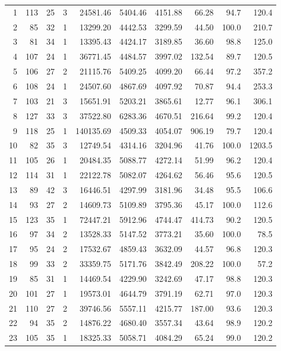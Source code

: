 \begin{longtable}{rrrrrrrrrr}
1 & 113 & 25 & 3 & 24581.46 & 5404.46 & 4151.88 & 66.28 & 94.7 & 120.4 \\
2 & 85 & 32 & 1 & 13299.20 & 4442.53 & 3299.59 & 44.50 & 100.0 & 210.7 \\
3 & 81 & 34 & 1 & 13395.43 & 4424.17 & 3189.85 & 36.60 & 98.8 & 125.0 \\
4 & 107 & 24 & 1 & 36771.45 & 4484.57 & 3997.02 & 132.54 & 89.7 & 120.5 \\
5 & 106 & 27 & 2 & 21115.76 & 5409.25 & 4099.20 & 66.44 & 97.2 & 357.2 \\
6 & 108 & 24 & 1 & 24507.60 & 4867.69 & 4097.92 & 70.87 & 94.4 & 253.3 \\
7 & 103 & 21 & 3 & 15651.91 & 5203.21 & 3865.61 & 12.77 & 96.1 & 306.1 \\
8 & 127 & 33 & 3 & 37522.80 & 6283.36 & 4670.51 & 216.64 & 99.2 & 120.4 \\
9 & 118 & 25 & 1 & 140135.69 & 4509.33 & 4054.07 & 906.19 & 79.7 & 120.4 \\
10 & 82 & 35 & 3 & 12749.54 & 4314.16 & 3204.96 & 41.76 & 100.0 & 1203.5 \\
11 & 105 & 26 & 1 & 20484.35 & 5088.77 & 4272.14 & 51.99 & 96.2 & 120.4 \\
12 & 114 & 31 & 1 & 22122.78 & 5082.07 & 4264.62 & 56.46 & 95.6 & 120.5 \\
13 & 89 & 42 & 3 & 16446.51 & 4297.99 & 3181.96 & 34.48 & 95.5 & 106.6 \\
14 & 93 & 27 & 2 & 14609.73 & 5109.89 & 3795.36 & 45.17 & 100.0 & 112.6 \\
15 & 123 & 35 & 1 & 72447.21 & 5912.96 & 4744.47 & 414.73 & 90.2 & 120.5 \\
16 & 97 & 34 & 2 & 13528.33 & 5147.52 & 3773.21 & 35.60 & 100.0 & 78.5 \\
17 & 95 & 24 & 2 & 17532.67 & 4859.43 & 3632.09 & 44.57 & 96.8 & 120.3 \\
18 & 99 & 33 & 2 & 33359.75 & 5171.76 & 3842.49 & 208.22 & 100.0 & 57.2 \\
19 & 85 & 31 & 1 & 14469.54 & 4229.90 & 3242.69 & 47.17 & 98.8 & 120.3 \\
20 & 101 & 27 & 1 & 19573.01 & 4644.79 & 3791.19 & 62.71 & 97.0 & 120.3 \\
21 & 110 & 27 & 2 & 39746.56 & 5557.11 & 4215.77 & 187.00 & 93.6 & 120.3 \\
22 & 94 & 35 & 2 & 14876.22 & 4680.40 & 3557.34 & 43.64 & 98.9 & 120.2 \\
23 & 105 & 35 & 1 & 18325.33 & 5058.71 & 4084.29 & 65.24 & 99.0 & 120.2 \\

\end{longtable}
